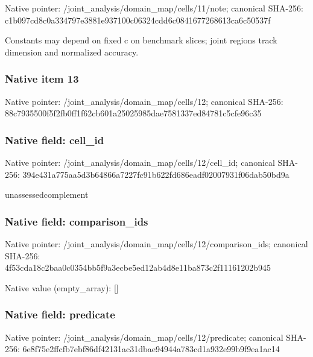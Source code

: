 \documentclass[10pt,a4paper]{article}
\begin{document}
Native pointer: /joint\_analysis/domain\_m\allowbreak{}ap/cells/11/note; canonical SHA-256: c1b097cd8c0a334797e3881e\allowbreak{}937100c06324cdd6c0841677\allowbreak{}268613ca6c50537f


Constants may depend on fixed c on benchmark slices; joint regions track dimension and normalized accuracy.


\subsubsection{Native item 13}


Native pointer: /joint\_analysis/domain\_map/cells/12; canonical SHA-256: 88c7935500f5f2fb0ff1f62c\allowbreak{}b601a25025985dae7581337e\allowbreak{}d84781c5cfe96c35



\subsubsection{Native field: cell\_id}


Native pointer: /joint\_analysis/domain\_m\allowbreak{}ap/cells/12/cell\_id; canonical SHA-256: 394e431a775aa5d3b64866a7\allowbreak{}227fc91b622fd686eadf0200\allowbreak{}7931f06dab50bd9a


unassessedcomplement


\subsubsection{Native field: comparison\_ids}


Native pointer: /joint\_analysis/domain\_m\allowbreak{}ap/cells/12/comparison\_i\allowbreak{}ds; canonical SHA-256: 4f53cda18c2baa0c0354bb5f\allowbreak{}9a3ecbe5ed12ab4d8e11ba87\allowbreak{}3c2f11161202b945



Native value (empty\_array): []



\subsubsection{Native field: predicate}


Native pointer: /joint\_analysis/domain\_m\allowbreak{}ap/cells/12/predicate; canonical SHA-256: 6e8f75e2ffcfb7ebf86df421\allowbreak{}31ac31dbae94944a783cd1a9\allowbreak{}32e99b9f9ea1ac14
\end{document}
